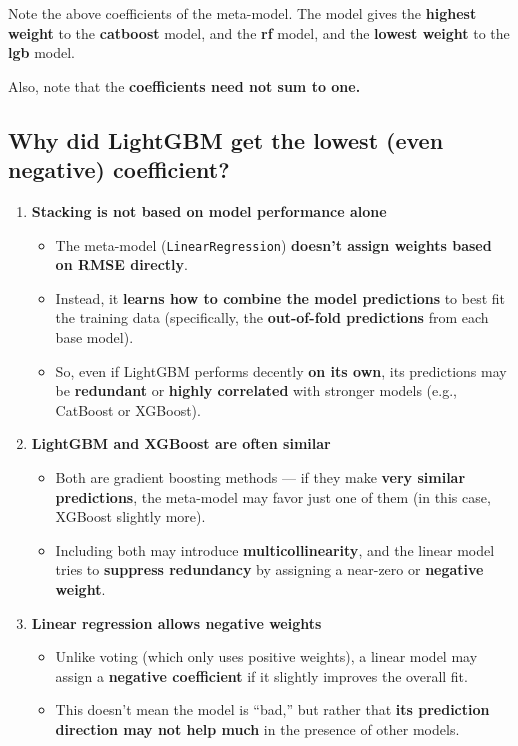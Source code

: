 \documentclass[
  letterpaper,
  DIV=11,
  numbers=noendperiod]{scrreprt}
\providecommand{\tightlist}{%
  \setlength{\itemsep}{0pt}\setlength{\parskip}{0pt}}\usepackage{longtable,booktabs,array}
\begin{document}
Note the above coefficients of the meta-model. The model gives the
\textbf{highest weight} to the \textbf{catboost} model, and the
\textbf{rf} model, and the \textbf{lowest weight} to the \textbf{lgb}
model.

Also, note that the \textbf{coefficients need not sum to one.}

\subsection{Why did LightGBM get the lowest (even negative)
coefficient?}\label{why-did-lightgbm-get-the-lowest-even-negative-coefficient}

\begin{enumerate}
\def\labelenumi{\arabic{enumi}.}
\tightlist
\item
  \textbf{Stacking is not based on model performance alone}

  \begin{itemize}
  \tightlist
  \item
    The meta-model (\texttt{LinearRegression}) \textbf{doesn't assign
    weights based on RMSE directly}.
  \item
    Instead, it \textbf{learns how to combine the model predictions} to
    best fit the training data (specifically, the \textbf{out-of-fold
    predictions} from each base model).
  \item
    So, even if LightGBM performs decently \textbf{on its own}, its
    predictions may be \textbf{redundant} or \textbf{highly correlated}
    with stronger models (e.g., CatBoost or XGBoost).
  \end{itemize}
\item
  \textbf{LightGBM and XGBoost are often similar}

  \begin{itemize}
  \tightlist
  \item
    Both are gradient boosting methods --- if they make \textbf{very
    similar predictions}, the meta-model may favor just one of them (in
    this case, XGBoost slightly more).
  \item
    Including both may introduce \textbf{multicollinearity}, and the
    linear model tries to \textbf{suppress redundancy} by assigning a
    near-zero or \textbf{negative weight}.
  \end{itemize}
\item
  \textbf{Linear regression allows negative weights}

  \begin{itemize}
  \tightlist
  \item
    Unlike voting (which only uses positive weights), a linear model may
    assign a \textbf{negative coefficient} if it slightly improves the
    overall fit.
  \item
    This doesn't mean the model is ``bad,'' but rather that \textbf{its
    prediction direction may not help much} in the presence of other
    models.
  \end{itemize}
\end{enumerate}
\end{document}
